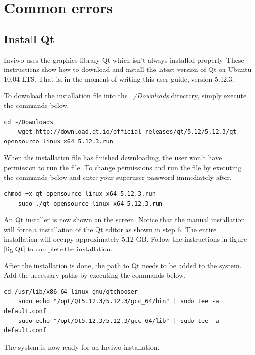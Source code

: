 \section{Common errors}
\label{sec:Common errors}

\subsection{Install Qt}
Inviwo uses the graphics library Qt which isn't always installed properly. These instructions show how to download and install the latest version of Qt on Ubuntu 10.04 LTS. That is, in the moment of writing this user guide, version 5.12.3. 

To download the installation file into the \emph{~/Downloads} directory, simply execute the commands below.

\begin{lstlisting}[frame = single, breaklines=true]
    cd ~/Downloads
    wget http://download.qt.io/official_releases/qt/5.12/5.12.3/qt-opensource-linux-x64-5.12.3.run
\end{lstlisting}

When the installation file has finished downloading, the user won't have permission to run the file. To change permissions and run the file by executing the commands below and enter your superuser password immediately after.
\begin{lstlisting}[frame = single, breaklines=true]
    chmod +x qt-opensource-linux-x64-5.12.3.run
    sudo ./qt-opensource-linux-x64-5.12.3.run
\end{lstlisting}

An Qt installer is now shown on the screen. Notice that the manual installation will force a installation of the Qt editor as shown in step 6. The entire installation will occupy approximately 5.12 GB. Follow the instructions in figure \ref{fig:Qt} to complete the installation.

After the installation is done, the path to Qt needs to be added to the system. Add the necessary paths by executing the commands below.

\begin{lstlisting}[frame = single, breaklines=true]
    cd /usr/lib/x86_64-linux-gnu/qtchooser
    sudo echo "/opt/Qt5.12.3/5.12.3/gcc_64/bin" | sudo tee -a default.conf
    sudo echo "/opt/Qt5.12.3/5.12.3/gcc_64/lib" | sudo tee -a default.conf
\end{lstlisting}

The system is now ready for an Inviwo installation.

